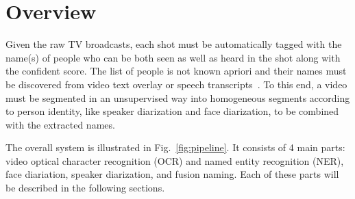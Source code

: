 \section{Overview}

Given the raw TV broadcasts, each shot must be automatically tagged with the name(s) of people who can be both seen as well as heard in the shot along with the confident score. The list of people is not known apriori and their names must be discovered from video text overlay or speech transcripts~\cite{bredin2016mediaeval}. 
%
To this end, a video must be segmented in an unsupervised way into homogeneous segments according to person identity, like  speaker diarization and face diarization, to be combined with the extracted names.
%


The overall system is illustrated in Fig.~\ref{fig:pipeline}. It consists of  4 main parts: video optical character recognition (OCR) and named entity recognition (NER), face diariation, speaker diarization, and fusion naming. Each of these parts will be described in the following sections.

\endinput
